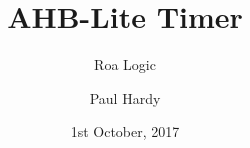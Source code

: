 
\usepackage{pkg/roalogictitle}



\title{AHB-Lite Timer}
\author{Roa Logic}
\date{1st October, 2017}
\author{Paul Hardy}

 
\pagestyle{fancy}
\fancyhf{}



\fancyhead[R]{\thepage}
